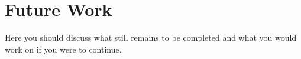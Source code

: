 \chapter{Future Work}
Here you should discuss what still remains to be completed and what you would work on if you were to continue.